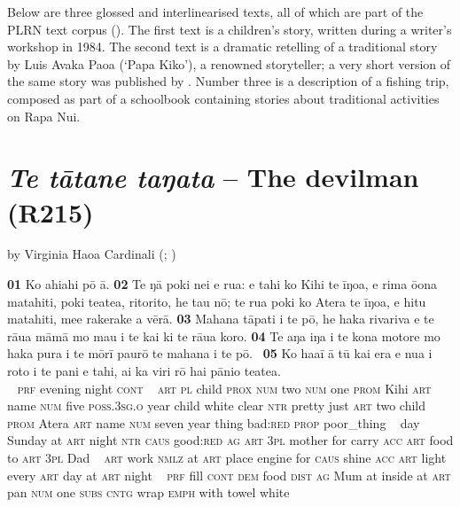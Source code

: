 {
Below are three glossed and interlinearised texts, all of which are part of the PLRN text corpus (). The first text is a children’s story, written during a writer’s workshop in 1984. The second text is a dramatic retelling of a traditional story by Luis Avaka Paoa (‘Papa Kiko’), a renowned storyteller; a very short version of the same story was published by \citet{Blixen1974}. Number three is a description of a fishing trip, composed as part of a schoolbook containing stories about traditional activities on Rapa Nui.

\section*{\textit{Te tātane taŋata} – The devilman (R215)}\label{sec:a.1}

by Virginia Haoa Cardinali (\citealt{HaoaCardinali1984}; \citealt[Vol. 3:118–119]{WeberWeber1990Mai})

\bigskip\gll
\textbf{\textup{01}} Ko ahiahi pō {\ꞌ}ā. \textbf{\textup{02}} Te ŋā poki nei e rua: e tahi ko Kihi te {\ꞌ}īŋoa, e rima ō{\ꞌ}ona matahiti, poki teatea, ritorito, he tau nō; te rua poki ko {\ꞌ}Atera te {\ꞌ}īŋoa, e hitu matahiti, me{\ꞌ}e rakerake a vērā. \textbf{\textup{03}} Mahana tāpati {\ꞌ}i te pō, he haka rivariva e te rāua māmā mo ma{\ꞌ}u i te kai ki te rāua koro. \textbf{\textup{04}} Te aŋa iŋa {\ꞌ}i te kona motore mo haka pura i te mōrī paurō te mahana {\ꞌ}i te pō. ~\textbf{\textup{05}} Ko ha{\ꞌ}a{\ꞌ}ī {\ꞌ}ā tū kai era e nua {\ꞌ}i roto i te pani e tahi, {\ꞌ}ai ka viri rō hai pānio teatea.\\ 
~ \textsc{prf} evening night \textsc{cont} ~  \textsc{art} \textsc{pl} child \textsc{prox} \textsc{num} two \textsc{num} one \textsc{prom} Kihi \textsc{art} name \textsc{num} five \textsc{poss.3sg.o} year child white clear \textsc{ntr} pretty just \textsc{art} two child \textsc{prom} Atera \textsc{art} name \textsc{num} seven year thing bad:\textsc{red} \textsc{prop} poor\_thing ~ day Sunday at \textsc{art} night \textsc{ntr} \textsc{caus} good:\textsc{red} \textsc{ag} \textsc{art} \textsc{3pl} mother for carry \textsc{acc} \textsc{art} food to \textsc{art} \textsc{3pl} Dad ~  \textsc{art} work \textsc{nmlz} at \textsc{art} place engine for \textsc{caus} shine \textsc{acc} \textsc{art} light every \textsc{art} day at \textsc{art} night ~ \textsc{prf} fill \textsc{cont} \textsc{dem} food \textsc{dist} \textsc{ag} Mum at inside at \textsc{art} pan \textsc{num} one \textsc{subs} \textsc{cntg} wrap \textsc{emph} with towel white\\ 
 
}
